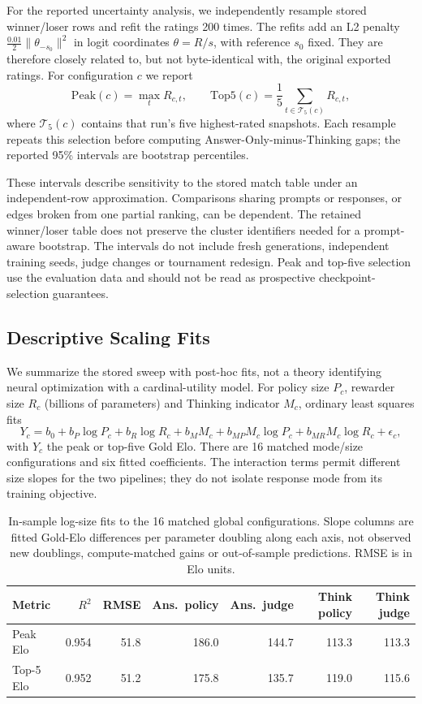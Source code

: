\documentclass[11pt,letterpaper]{article}
\begin{document}
For the reported uncertainty analysis, we independently resample stored winner/loser rows and refit the ratings 200 times. The refits add an L2 penalty $\frac{0.01}{2}\|\theta_{-s_0}\|^2$ in logit coordinates $\theta=R/s$, with reference $s_0$ fixed. They are therefore closely related to, but not byte-identical with, the original exported ratings. For configuration $c$ we report
\[
\mathrm{Peak}(c)=\max_t R_{c,t},
\qquad
\mathrm{Top5}(c)=\frac{1}{5}\sum_{t\in\mathcal T_5(c)}R_{c,t},
\]
where $\mathcal T_5(c)$ contains that run's five highest-rated snapshots. Each resample repeats this selection before computing Answer-Only-minus-Thinking gaps; the reported 95\% intervals are bootstrap percentiles.

These intervals describe sensitivity to the stored match table under an independent-row approximation. Comparisons sharing prompts or responses, or edges broken from one partial ranking, can be dependent. The retained winner/loser table does not preserve the cluster identifiers needed for a prompt-aware bootstrap. The intervals do not include fresh generations, independent training seeds, judge changes or tournament redesign. Peak and top-five selection use the evaluation data and should not be read as prospective checkpoint-selection guarantees.

\subsection{Descriptive Scaling Fits}
\label{app:scaling-law-fits}

We summarize the stored sweep with post-hoc fits, not a theory identifying neural optimization with a cardinal-utility model. For policy size $P_c$, rewarder size $R_c$ (billions of parameters) and Thinking indicator $M_c$, ordinary least squares fits
\[
Y_c=b_0+b_P\log P_c+b_R\log R_c+b_M M_c
       +b_{MP}M_c\log P_c+b_{MR}M_c\log R_c+\epsilon_c,
\]
with $Y_c$ the peak or top-five Gold Elo. There are 16 matched mode/size configurations and six fitted coefficients. The interaction terms permit different size slopes for the two pipelines; they do not isolate response mode from its training objective.

\begin{table}[htbp]
\centering\small
\setlength{\tabcolsep}{4pt}
\begin{tabular}{lrrrrrr}
\toprule
Metric & $R^2$ & RMSE & Ans.\ policy & Ans.\ judge & Think policy & Think judge \\
\midrule
Peak Elo & 0.954 & 51.8 & 186.0 & 144.7 & 113.3 & 113.3 \\
Top-5 Elo & 0.952 & 51.2 & 175.8 & 135.7 & 119.0 & 115.6 \\
\bottomrule
\end{tabular}
\caption{In-sample log-size fits to the 16 matched global configurations. Slope columns are fitted Gold-Elo differences per parameter doubling along each axis, not observed new doublings, compute-matched gains or out-of-sample predictions. RMSE is in Elo units.}
\label{tab:scaling-law-fits}
\end{table}
\end{document}
